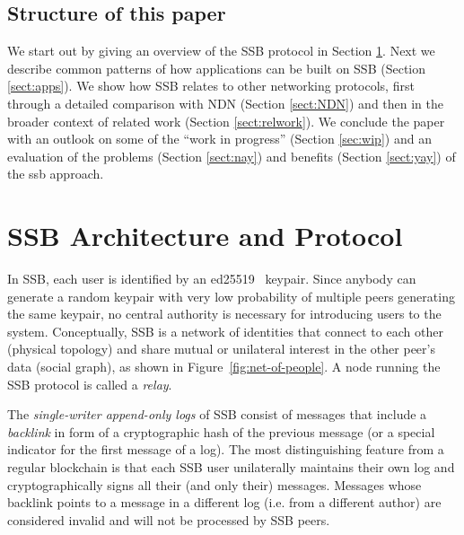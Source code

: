 \documentclass[10pt,sigconf,rewiew]{acmart}
\begin{document}
\subsection*{Structure of this paper}

We start out by giving an overview of the SSB protocol in Section \ref{sect:architecture}. Next we describe common patterns of how applications can be built on SSB (Section \ref{sect:apps}). We show how SSB relates to other networking protocols, first through a detailed comparison with NDN (Section \ref{sect:NDN}) and then in the broader context of related work (Section \ref{sect:relwork}). We conclude the paper with an outlook on some of the ``work in progress'' (Section \ref{sec:wip}) and an evaluation of the problems (Section \ref{sect:nay}) and benefits (Section \ref{sect:yay}) of the ssb approach.


\section{SSB Architecture and Protocol}
\label{sect:architecture}

In SSB, each user is identified by an ed25519~\cite{bernstein2012high} keypair. Since anybody can generate a random keypair with very low probability of multiple peers generating the same keypair, no central authority is necessary for introducing users to the system. Conceptually, SSB is a network of identities that connect to each other (physical topology) and share mutual or unilateral interest in the other peer's data (social graph), as shown in Figure~\ref{fig:net-of-people}. A node running the SSB protocol is called a \textit{relay}.

The {\em single-writer append-only logs} of SSB consist of  messages that include a {\em backlink} in form of a cryptographic hash of the previous message (or a special indicator for the first message of a log). The most distinguishing feature from a regular blockchain is that each SSB user unilaterally maintains their own log and cryptographically signs all their (and only their) messages. Messages whose backlink points to a message in a different log (i.e. from a different author) are considered invalid and will not be processed by SSB peers.

\end{document}
